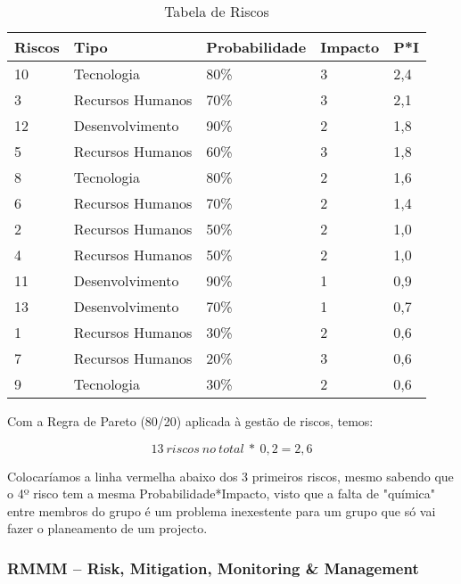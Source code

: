 \documentclass[12pt, a4paper, twoside]{report} %
\begin{document}
\begin{table}[h]
\centering
\begin{tabular}{|l|l l l l|}
\hline
Riscos              & Tipo             & Probabilidade & Impacto & P*I \\ \hline
10                  & Tecnologia       & 80\%   & 3 & 2,4   \\ \hline
3                   & Recursos Humanos & 70\%   & 3 & 2,1   \\ \hline
12 					& Desenvolvimento  & 90\%   & 2 & 1,8   \\ \hline
5             		& Recursos Humanos & 60\%   & 3 & 1,8   \\ \hline
8        			& Tecnologia       & 80\%   & 2 & 1,6   \\ \hline
6                   & Recursos Humanos & 70\%   & 2 & 1,4   \\ \hline
2                   & Recursos Humanos & 50\%   & 2 & 1,0   \\ \hline
4                   & Recursos Humanos & 50\%   & 2 & 1,0   \\ \hline
11              	& Desenvolvimento  & 90\%   & 1 & 0,9   \\ \hline
13                  & Desenvolvimento  & 70\%   & 1 & 0,7   \\ \hline
1                   & Recursos Humanos & 30\%   & 2 & 0,6   \\ \hline
7                   & Recursos Humanos & 20\%   & 3 & 0,6   \\ \hline
9 					& Tecnologia       & 30\%   & 2 & 0,6   \\ \hline
\end{tabular}
\caption{Tabela de Riscos}
\label{riscos}
\end{table}

\noindent Com a Regra de Pareto (80/20) aplicada à gestão de riscos, temos:

\begin{equation}
13 \ riscos \ no \ total \ * \ 0,2 = 2,6
\end{equation}

\noindent Colocaríamos a linha vermelha abaixo dos 3 primeiros riscos, mesmo sabendo que o 4º risco tem a mesma Probabilidade*Impacto, visto que a falta de "química" entre membros do grupo é um problema inexestente para um grupo que só vai fazer o planeamento de um projecto.

\subsubsection{RMMM – Risk, Mitigation, Monitoring \& Management}
\end{document}

